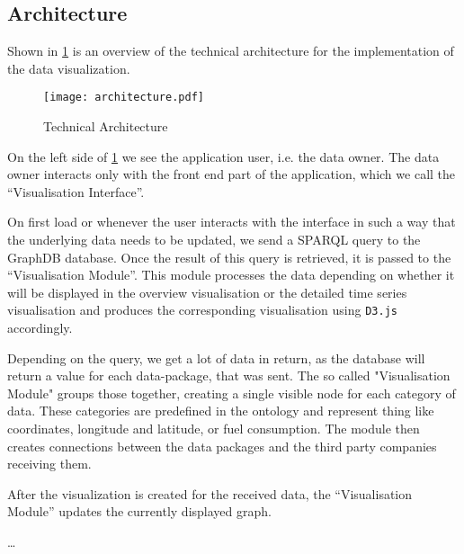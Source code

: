\documentclass[../paper.tex]{subfiles}
\begin{document}
  \subsection{Architecture}

  Shown in \cref{fig:architecture} is an overview of the technical architecture
  for the implementation of the data visualization.

  \begin{figure}
    \centering
    \texttt{[image: architecture.pdf]}
    \caption{Technical Architecture}
    \label{fig:architecture}
  \end{figure}

  On the left side of \cref{fig:architecture} we see the application user, i.e.
  the data owner. The data owner interacts only with the front end part of the
  application, which we call the “Visualisation Interface”.

  On first load or whenever the user interacts with the interface in such a way
  that the underlying data needs to be updated, we send a SPARQL query to the
  GraphDB database. Once the result of this query is retrieved, it is passed to
  the “Visualisation Module”. This module processes the data depending on
  whether it will be displayed in the overview visualisation or the detailed
  time series visualisation and produces the corresponding visualisation
  using \texttt{D3.js} accordingly.

  Depending on the query, we get a lot of data in return, as the database
  will return a value for each data-package, that was sent. The so called
  "Visualisation Module" groups those together, creating a single visible
  node for each category of data. These categories are predefined in the
  ontology and represent thing like coordinates, longitude and latitude, or
  fuel consumption. The module then creates connections between the data packages
  and the third party companies receiving them.

  After the visualization is created for the received data, the “Visualisation Module”
  updates the currently displayed graph.


  …
\end{document}
